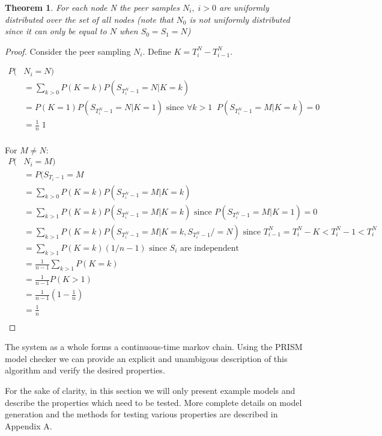 \documentclass[a4paper,10pt]{article}
\newcommand{\prismmodel}[1]{
  \begin{quotation}
  \footnotesize
  
  \end{quotation}
}
\newtheorem*{thm}{Theorem}
\begin{document}
\begin{thm}For each node N the peer samples $N_i, \; i>0$ are uniformly distributed over the set of all nodes (note that $N_0$ is not uniformly distributed since it can only be equal to $N$ when $S_0 = S_1 = N$)\end{thm}

\begin{proof}
Consider the peer sampling $N_i$. Define $K = T^N_i - T^N_{i-1}$.

\begin{align*}
P(&N_i = N) \\
& = \sum_{k>0} P(K=k) P(S_{T^N_i-1}=N | K=k) \\
& = P(K=1) P(S_{T^N_i-1}=N | K=1) \text{ since $\forall k>1 \;\; P(S_{T^N_i-1}=M | K=k) = 0$} \\
& = \frac{1}{n} \; 1 \\
\end{align*}

\noindent For $M \neq N$: \\
\begin{align*}
P(&N_i = M) \\
& = P(S_{T_i-1} = M \\
& = \sum_{k>0} P(K=k) P(S_{T^N_i-1}=M | K=k) \\
& = \sum_{k>1} P(K=k) P(S_{T^N_i-1}=M | K=k) \text{ since $P(S_{T^N_i-1}=M | K=1) = 0$} \\
& = \sum_{k>1} P(K=k) P(S_{T^N_i-1}=M | K=k, S_{T^N_i-1} /= N) \text{ since $T^N_{i-1} = T^N_i - K < T^N_i-1 < T^N_i$} \\
& = \sum_{k>1} P(K=k) (1 / n-1) \text{ since $S_i$ are independent} \\
& = \frac{1}{n-1} \sum_{k>1} P(K=k) \\
& = \frac{1}{n-1} P(K>1) \\
& = \frac{1}{n-1} (1 - \frac{1}{n}) \\
& = \frac{1}{n} \\
\end{align*}

\end{proof}

The system as a whole forms a continuous-time markov chain. Using the PRISM model checker we can provide an explicit and unambigous description of this algorithm and verify the desired properties.

\prismmodel{ctmc_single}

For the sake of clarity, in this section we will only present example models and describe the properties which need to be tested. More complete details on model generation and the methods for testing various properties are described in Appendix A.
\end{document}
